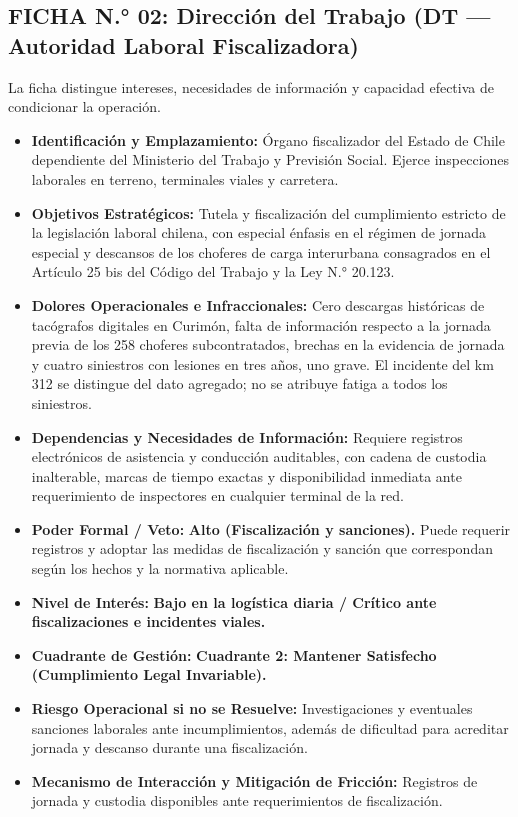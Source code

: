 \subsection*{FICHA N.° 02: Dirección del Trabajo (DT — Autoridad Laboral Fiscalizadora)}
La ficha distingue intereses, necesidades de información y capacidad efectiva de condicionar la operación.
\begin{itemize}
\item \textbf{Identificación y Emplazamiento:} Órgano fiscalizador del Estado de Chile dependiente del Ministerio del Trabajo y Previsión Social. Ejerce inspecciones laborales en terreno, terminales viales y carretera.
\item \textbf{Objetivos Estratégicos:} Tutela y fiscalización del cumplimiento estricto de la legislación laboral chilena, con especial énfasis en el régimen de jornada especial y descansos de los choferes de carga interurbana consagrados en el Artículo 25 bis del Código del Trabajo y la Ley N.° 20.123.
\item \textbf{Dolores Operacionales e Infraccionales:} Cero descargas históricas de tacógrafos digitales en Curimón, falta de información respecto a la jornada previa de los 258 choferes subcontratados, brechas en la evidencia de jornada y cuatro siniestros con lesiones en tres años, uno grave. El incidente del km 312 se distingue del dato agregado; no se atribuye fatiga a todos los siniestros.
\item \textbf{Dependencias y Necesidades de Información:} Requiere registros electrónicos de asistencia y conducción auditables, con cadena de custodia inalterable, marcas de tiempo exactas y disponibilidad inmediata ante requerimiento de inspectores en cualquier terminal de la red.
\item \textbf{Poder Formal / Veto:} \textbf{Alto (Fiscalización y sanciones).} Puede requerir registros y adoptar las medidas de fiscalización y sanción que correspondan según los hechos y la normativa aplicable.
\item \textbf{Nivel de Interés:} \textbf{Bajo en la logística diaria / Crítico ante fiscalizaciones e incidentes viales.}
\item \textbf{Cuadrante de Gestión:} \textbf{Cuadrante 2: Mantener Satisfecho (Cumplimiento Legal Invariable).}
\item \textbf{Riesgo Operacional si no se Resuelve:} Investigaciones y eventuales sanciones laborales ante incumplimientos, además de dificultad para acreditar jornada y descanso durante una fiscalización.
\item \textbf{Mecanismo de Interacción y Mitigación de Fricción:} Registros de jornada y custodia disponibles ante requerimientos de fiscalización.
\end{itemize}
